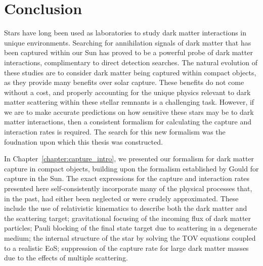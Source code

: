 
\chapter{Conclusion}
\label{chapter:conclusion}

  
Stars have long been used as laboratories to study dark matter interactions in unique environments. Searching for annihilation signals of dark matter that has been captured within our Sun has proved to be a powerful probe of dark matter interactions, complimentary to direct detection searches.
The natural evolution of these studies are to consider dark matter being captured within compact objects, as they provide many benefits over solar capture. These benefits do not come without a cost, and properly accounting for the unique physics relevant to dark matter scattering within these stellar remnants is a challenging task. However, if we are to make accurate predictions on how sensitive these stars may be to dark matter interactions, then a consistent formalism for calculating the capture and interaction rates is required. The search for this new formalism was the foudnation upon which this thesis was constructed.


In Chapter~\ref{chapter:capture_intro}, we presented our formalism for dark matter capture in compact objects,  building upon the formalism established by Gould for capture in the Sun. The exact expressions for the capture and interaction rates presented here self-consistently incorporate many of the physical processes that, in the past, had either been neglected or were crudely approximated. These include the use of relativistic kinematics to describe both the dark matter and the scattering target; gravitational focusing of the incoming flux of dark matter particles; Pauli blocking of the final state target due to scattering in a degenerate medium; the internal structure of the star by solving the TOV equations coupled to a realistic EoS; suppression of the capture rate for large dark matter masses due to the effects of multiple scattering. 


